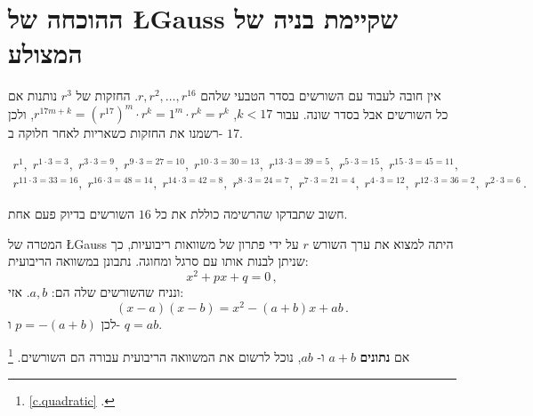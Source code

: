 

\section{ההוכחה של 
\L{Gauss}
שקיימת בניה של המצולע
}\label{s.gauss}

אין חובה לעבוד עם השורשים בסדר הטבעי שלהם
$r,r^2,\ldots,r^{16}$. 
החזקות של
$r^3$
נותנות אם כל השורשים אבל בסדר שונה. עבור
$k<17$, $r^{17m+k}=(r^{17})^m\cdot r^k=1^m\cdot r^k=r^k$,
ולכן רשמנו את החזקות כשאריות לאחר חלוקה ב-%
$17$.

\begin{eqnarray}
r^1, \;r^{1\cdot 3 =3},\; r^{3\cdot 3=9},\; r^{9\cdot 3=27=10},\; r^{10\cdot 3=30=13},\; r^{13\cdot 3=39=5},\; r^{5\cdot 3=15},\; r^{15\cdot 3=45=11},\\
r^{11\cdot 3 =33=16}, \;r^{16\cdot 3=48=14},\; r^{14\cdot 3=42=8},\; r^{8\cdot 3=24=7},\;r^{7\cdot 3=21=4},\; r^{4\cdot 3=12},\; r^{12\cdot 3=36=2},\; r^{2\cdot 3=6}\,.
\end{eqnarray}



חשוב שתבדקו שהרשימה כוללת את כל 
$16$
השורשים בדיוק פעם אחת.

המטרה של
\L{Gauss}
היתה למצוא את ערך השורש
$r$
על ידי פתרון של משוואות ריבועיות, כך שניתן לבנות אותו עם סרגל ומחוגה. נתבונן במשוואה הריבועית:
\[
x^2+px+q=0\,,
\]
ונניח שהשורשים שלה הם:
$a,b$.
אזי:
\[
(x-a)(x-b)=x^2 - (a+b)x + ab\,.
\]
לכן
$p=-(a+b)$
ו-%
$q=ab$.

אם
\textbf{נתונים}
$a+b$
ו-%
$ab$,
נוכל לרשום את המשוואה הריבועית עבורה הם השורשים.%
\footnote{
\ref{c.quadratic}
.}

